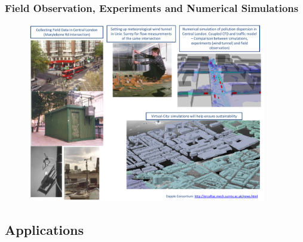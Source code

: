 \documentclass[10pt,compress,handout,ignorenonframetext]{beamer}
\begin{document}
\begin{frame}
 \frametitle{Field Observation, Experiments and Numerical Simulations} 

   \begin{figure}%
    \begin{center}
     \includegraphics[width=12.cm, height=7.8cm, clip]{./Figs/Dapple.pdf}
    \end{center}
   \end{figure}    

\end{frame}

\subsection{Applications}
\end{document}
